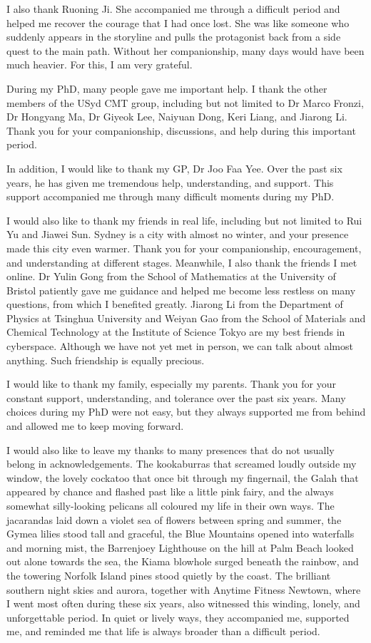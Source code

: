 I also thank Ruoning Ji.
She accompanied me through a difficult period and helped me recover the courage that I had once lost.
She was like someone who suddenly appears in the storyline and pulls the protagonist back from a side quest to the main path.
Without her companionship, many days would have been much heavier.
For this, I am very grateful.

During my PhD, many people gave me important help.
I thank the other members of the USyd CMT group, including but not limited to Dr Marco Fronzi, Dr Hongyang Ma, Dr Giyeok Lee, Naiyuan Dong, Keri Liang, and Jiarong Li.
Thank you for your companionship, discussions, and help during this important period.

In addition, I would like to thank my GP, Dr Joo Faa Yee.
Over the past six years, he has given me tremendous help, understanding, and support.
This support accompanied me through many difficult moments during my PhD.

I would also like to thank my friends in real life, including but not limited to Rui Yu and Jiawei Sun.
Sydney is a city with almost no winter, and your presence made this city even warmer.
Thank you for your companionship, encouragement, and understanding at different stages.
Meanwhile, I also thank the friends I met online.
Dr Yulin Gong from the School of Mathematics at the University of Bristol patiently gave me guidance and helped me become less restless on many questions, from which I benefited greatly.
Jiarong Li from the Department of Physics at Tsinghua University and Weiyan Gao from the School of Materials and Chemical Technology at the Institute of Science Tokyo are my best friends in cyberspace.
Although we have not yet met in person, we can talk about almost anything.
Such friendship is equally precious.

I would like to thank my family, especially my parents.
Thank you for your constant support, understanding, and tolerance over the past six years.
Many choices during my PhD were not easy, but they always supported me from behind and allowed me to keep moving forward.

I would also like to leave my thanks to many presences that do not usually belong in acknowledgements.
The kookaburras that screamed loudly outside my window, the lovely cockatoo that once bit through my fingernail,
the Galah that appeared by chance and flashed past like a little pink fairy,
and the always somewhat silly-looking pelicans all coloured my life in their own ways.
The jacarandas laid down a violet sea of flowers between spring and summer,
the Gymea lilies stood tall and graceful,
the Blue Mountains opened into waterfalls and morning mist,
the Barrenjoey Lighthouse on the hill at Palm Beach looked out alone towards the sea,
the Kiama blowhole surged beneath the rainbow,
and the towering Norfolk Island pines stood quietly by the coast.
The brilliant southern night skies and aurora,
together with Anytime Fitness Newtown, where I went most often during these six years,
also witnessed this winding, lonely, and unforgettable period.
In quiet or lively ways, they accompanied me, supported me, and reminded me that life is always broader than a difficult period.

